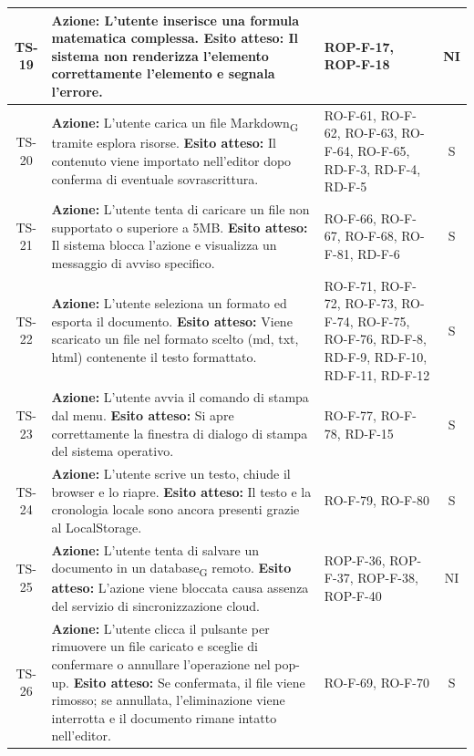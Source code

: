 \documentclass[11pt,a4paper]{article}
\newcommand{\gls}[1]{#1\textsubscript{G}}
\begin{document}
\begin{longtable}{|c|p{9cm}|p{3cm}|c|}
TS-19 & \textbf{Azione:} L'utente inserisce una formula matematica complessa. \newline \textbf{Esito atteso:} Il sistema non renderizza l'elemento correttamente l'elemento e segnala l'errore. & ROP-F-17, ROP-F-18 & NI \\
\hline

TS-20 & \textbf{Azione:} L'utente carica un file \gls{Markdown} tramite esplora risorse. \newline \textbf{Esito atteso:} Il contenuto viene importato nell'editor dopo conferma di eventuale sovrascrittura. & RO-F-61, RO-F-62, RO-F-63, RO-F-64, RO-F-65, RD-F-3, RD-F-4, RD-F-5 & S \\ \hline
TS-21 & \textbf{Azione:} L'utente tenta di caricare un file non supportato o superiore a 5MB. \newline \textbf{Esito atteso:} Il sistema blocca l'azione e visualizza un messaggio di avviso specifico. & RO-F-66, RO-F-67, RO-F-68, RO-F-81, RD-F-6 & S \\
\hline
TS-22 & \textbf{Azione:} L'utente seleziona un formato ed esporta il documento. \newline \textbf{Esito atteso:} Viene scaricato un file nel formato scelto (md, txt, html) contenente il testo formattato. & RO-F-71, RO-F-72, RO-F-73, RO-F-74, RO-F-75, RO-F-76, RD-F-8, RD-F-9, RD-F-10, RD-F-11, RD-F-12 & S \\
\hline
TS-23 & \textbf{Azione:} L'utente avvia il comando di stampa dal menu. \newline \textbf{Esito atteso:} Si apre correttamente la finestra di dialogo di stampa del sistema operativo. & RO-F-77, RO-F-78, RD-F-15 & S \\
\hline
TS-24 & \textbf{Azione:} L'utente scrive un testo, chiude il browser e lo riapre. \newline \textbf{Esito atteso:} Il testo e la cronologia locale sono ancora presenti grazie al LocalStorage. & RO-F-79, RO-F-80 & S \\
\hline
TS-25 & \textbf{Azione:} L'utente tenta di salvare un documento in un \gls{database} remoto. \newline \textbf{Esito atteso:} L'azione viene bloccata causa assenza del servizio di sincronizzazione cloud. & ROP-F-36, ROP-F-37, ROP-F-38, ROP-F-40 & NI \\
\hline
TS-26 & \textbf{Azione:} L'utente clicca il pulsante per rimuovere un file caricato e sceglie di confermare o annullare l'operazione nel pop-up. \newline \textbf{Esito atteso:} Se confermata, il file viene rimosso; se annullata, l'eliminazione viene interrotta e il documento rimane intatto nell'editor. & RO-F-69, RO-F-70 & S \\
\hline
\end{longtable}
\end{document}
